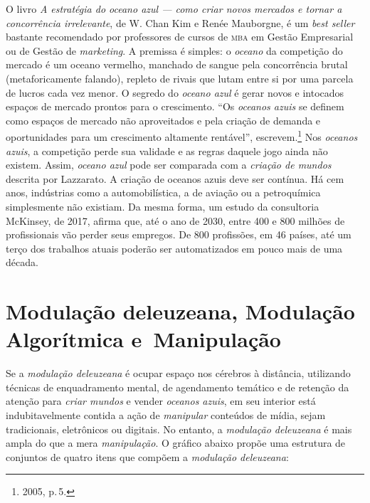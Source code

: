 O livro \emph{A estratégia do \emph{oceano azul} --- como criar novos mercados e
tornar a concorrência irrelevante}, de W. Chan Kim e Renée Mauborgne, é
um \emph{best seller} bastante recomendado por professores de cursos de
\textsc{mba} em Gestão Empresarial ou de Gestão de \emph{marketing}. A premissa é
simples: o \emph{oceano} da competição do mercado é um oceano vermelho,
manchado de sangue pela concorrência brutal (metaforicamente falando),
repleto de rivais que lutam entre si por uma parcela de lucros cada vez
menor. O segredo do \emph{oceano azul} é gerar novos e intocados espaços de
mercado prontos para o crescimento. ``Os \emph{oceanos azuis} se definem como
espaços de mercado não aproveitados e pela criação de demanda e
oportunidades para um crescimento altamente rentável'', escrevem.\footnote{2005,
p.\,5.} Nos \emph{oceanos azuis}, a competição perde sua validade e as regras
daquele jogo ainda não existem. Assim, \emph{oceano azul} pode ser
comparada com a \emph{criação de mundos} descrita por Lazzarato. A
criação de oceanos azuis deve ser contínua. Há cem anos, indústrias como
a automobilística, a de aviação ou a petroquímica simplesmente não
existiam. Da mesma forma, um estudo da consultoria McKinsey, de 2017,
afirma que, até o ano de 2030, entre 400 e 800 milhões de profissionais
vão perder seus empregos. De 800 profissões, em 46 países, até um terço
dos trabalhos atuais poderão ser automatizados em pouco mais de uma
década.

\section{Modulação deleuzeana, Modulação Algorítmica e~Manipulação}

Se a \emph{modulação deleuzeana} é ocupar espaço nos cérebros à
distância, utilizando técnicas de enquadramento mental, de agendamento
temático e de retenção da atenção para \emph{criar mundos} e vender
\emph{oceanos azuis}, em seu interior está indubitavelmente contida a
ação de \emph{manipular} conteúdos de mídia, sejam tradicionais,
eletrônicos ou digitais. No entanto, a \emph{modulação deleuzeana} é
mais ampla do que a mera \emph{manipulação}. O gráfico abaixo propõe uma
estrutura de conjuntos de quatro itens que compõem a \emph{modulação
deleuzeana}:

